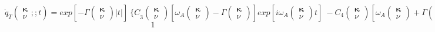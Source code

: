 \[{\dot{q}}_T\left( \begin{array}{c}
{\mathbf \kappa } \\ 
\nu  \end{array}
;;t\right)={exp \left[-\Gamma \left( \begin{array}{c}
{\mathbf \kappa } \\ 
\nu  \end{array}
\right)\left|t\right|\right]\ }{\{C}_3\left( \begin{array}{c}
{\mathbf \kappa } \\ 
\nu  \end{array}
\right)\left[{\omega }_A\left( \begin{array}{c}
{\mathbf \kappa } \\ 
\nu  \end{array}
\right)-\Gamma \left( \begin{array}{c}
{\mathbf \kappa } \\ 
\nu  \end{array}
\right)\right]{exp \left[i{\omega }_A\left( \begin{array}{c}
{\mathbf \kappa } \\ 
\nu  \end{array}
\right)t\right]\ }-C_4\left( \begin{array}{c}
{\mathbf \kappa } \\ 
\nu  \end{array}
\right){\left[{\omega }_A\left( \begin{array}{c}
{\mathbf \kappa } \\ 
\nu  \end{array}
\right)+\Gamma \left( \begin{array}{c}
{\mathbf \kappa } \\ 
\nu  \end{array}
\right)\right]exp \left[-i{\omega }_A\left( \begin{array}{c}
{\mathbf \kappa } \\ 
\nu  \end{array}
\right)t\right]\ }\}\] 
\[1\] 
